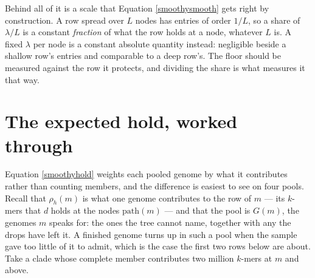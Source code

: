 \documentclass[pdflatex,sn-vancouver-num]{sn-jnl}
\begin{document}
\begin{appendices}
    Behind all of it is a scale that Equation \eqref{smoothysmooth} gets right by construction. A row
    spread over $L$ nodes has entries of order $1 / L$, so a share of $\lambda / L$ is a constant
    \emph{fraction} of what the row holds at a node, whatever $L$ is. A fixed $\lambda$ per node is a
    constant absolute quantity instead: negligible beside a shallow row's entries and comparable to a
    deep row's. The floor should be measured against the row it protects, and dividing the share is
    what measures it that way.

    \section{The expected hold, worked through}\label{effexample}
    Equation \eqref{smoothyhold} weights each pooled genome by what it contributes rather than
    counting members, and the difference is easiest to see on four pools. Recall that $\rho_h(m)$ is
    what one genome contributes to the row of $m$ --- its $k$-mers that $d$ holds at the nodes
    $\mathrm{path}(m)$ --- and that the pool is $G(m)$, the genomes $m$ speaks for: the ones the tree
    cannot name, together with any the drops have left it. A finished genome turns up in such a pool
    when the sample gave too little of it to admit, which is the case the first two rows below are
    about. Take a clade whose complete member contributes two million $k$-mers at $m$ and
    above.


\end{appendices}
\end{document}
